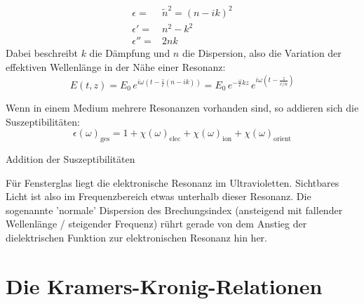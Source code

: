 \begin{align}
 \epsilon = & \tilde{n}^2 = (n - i k)^2 \\
  \epsilon' =& n^2 - k^2 \\
 \epsilon'' = & 2 n k
\end{align}
Dabei beschreibt $k$ die Dämpfung und $n$ die Dispersion, also die Variation der effektiven Wellenlänge in der Nähe einer Resonanz:
\begin{equation}
E(t,z) = E_0 \, e^{i \omega (t - \frac{z}{c}(n - i k))} = 
 E_0 \, e^{ - \frac{\omega}{c} k z}  
 \, e^{i \omega (t - \frac{z}{c/n} )} 
\end{equation}

Wenn in einem Medium mehrere Resonanzen vorhanden sind, so addieren sich die Suszeptibilitäten:
\begin{equation}
\epsilon(\omega)_\text{ges} = 1 + \chi(\omega)_\text{elec} +  \chi(\omega)_\text{ion}  + \chi(\omega)_\text{orient}
\end{equation}

\begin{marginfigure}

\caption{Addition der Suszeptibilitäten}
\end{marginfigure}

Für Fensterglas liegt die elektronische Resonanz im Ultravioletten. Sichtbares Licht ist also im Frequenzbereich etwas unterhalb dieser Resonanz. Die sogenannte 'normale' Dispersion des Brechungsindex (ansteigend mit fallender Wellenlänge / steigender Frequenz) rührt gerade von dem Anstieg der dielektrischen Funktion zur elektronischen Resonanz hin her.


\section{Die Kramers-Kronig-Relationen}

